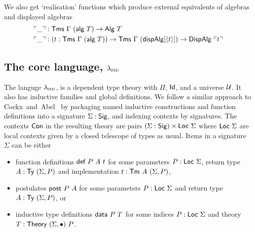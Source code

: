 We also get `realisation' functions which produce external equivalents of algebras
and displayed algebras
\begin{align*}
    &\emb{\_} : \Tms\ \Gamma\ (\mta{alg}\ T) \to \mta{Alg}\ T \\
    &\emb{\_} : (t : \Tms\ \Gamma\ (\mta{alg}\ T)) \to \Tms\ \Gamma\ (\mta{dispAlg}[\Msub{t}]) \to \mta{DispAlg}\ \emb{t} \\
\end{align*}



\subsection{The core language, $\lambda_{\textsc{ind}}$}

The languge $\lambda_{\textsc{ind}}$, is a dependent type theory with $\Pi$, $\textsf{Id}$, and
a universe $\mathcal{U}$.
It also has inductive families and global definitions. We follow a similar
approach to Cockx~and~Abel~\cite{Cockx2018-fk} by packaging named inductive
constructions and function definitions into a signature $\Sigma : \textsf{Sig}$, and
indexing contexts by signatures. The contexts $\textsf{Con}$ in the resulting theory are
pairs $(\Sigma : \textsf{Sig}) \times \textsf{Loc}\ \Sigma$ where $\Loc\ \Sigma$ are local
contexts given by a closed telescope of types as usual. Items in a signature
$\Sigma$ can be either

\begin{itemize}
	\item function definitions $\mta{def}\ P\ A\ t$ for some parameters $P : \textsf{Loc}\
		      \Sigma$, return type $A : \textsf{Ty}\ (\Sigma, P)$ and implementation $t : \textsf{Tm}\ A\ (\Sigma, P)$,
	\item postulates $\textsf{post}\ P\ A$ for some parameters $P : \textsf{Loc}\
		      \Sigma$ and return type $A : \textsf{Ty}\ (\Sigma, P)$, or
	\item inductive type definitions $\mta{data}\ P\ T$ for some indices $P :
		      \textsf{Loc}\ \Sigma$ and theory $T : \textsf{Theory}\ (\Sigma, \bullet)\ P$.
\end{itemize}

